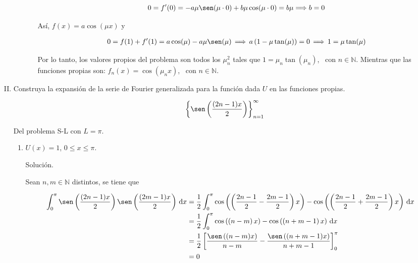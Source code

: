 \documentclass[fleqn]{article}
\newcommand{\nat}{\mathbb{N}}
\newcommand{\integ}[3]{\displaystyle \int_{#1}^{#2} #3 \, \mathrm{d} x}
\begin{document}
\begin{enumerate}[I.]
\begin{enumerate}
\begin{enumerate}[i)]
				\begin{equation*}
					0 = f'(0) = -a \mu \sen(\mu \cdot 0) + b \mu \cos(\mu \cdot 0) = b \mu \Longrightarrow b = 0
				\end{equation*}

				Así, $ f(x) = a \cos(\mu x) $ y 

				\begin{align*}
					0 = f(1) + f'(1) = a \cos(\mu) - a \mu \sen(\mu) \, \Longrightarrow \, a \left( 1 - \mu \tan(\mu) \right) = 0 \, \Longrightarrow \, 1 = \mu \tan (\mu)
				\end{align*}
				
				Por lo tanto, los valores propios del problema son todos los $ \mu_n^2 $ tales que $ 1 = \mu_n \tan (\mu_n) $, \, con $ n \in \nat $. Mientras que las funciones propias son: $ f_n (x) = \cos(\mu_n x) $, \, con $ n \in \nat $.
			\end{enumerate}
			
		\end{enumerate}

		
		\bfseries
			
		\item Construya la expansión de la serie de Fourier generalizada para la función dada $U$ en las funciones propias.
		
		\begin{equation*}
			\left\lbrace \sen \left( \dfrac{(2n - 1) x}{2} \right) \right\rbrace_{n=1}^{\infty}
		\end{equation*}

		Del problema S-L con $ L = \pi $.
		
		\begin{enumerate}
			\item $ U(x) = 1 $, $ 0 \leq x \leq \pi $.
			
			Solución.
			
			\normalfont

                Sean $ n, m \in \nat $ distintos, se tiene que

                \begin{align*}
                     \integ{0}{\pi}{\sen \left( \dfrac{(2n - 1) x}{2} \right) \sen \left( \dfrac{(2m - 1) x}{2} \right)} &= \dfrac{1}{2} \integ{0}{\pi}{ \cos \left( \left( \dfrac{2n - 1}{2} - \dfrac{2m - 1}{2} \right) x \right) - \cos \left( \left( \dfrac{2n - 1}{2} + \dfrac{2m - 1}{2} \right) x \right) } \\
                     &= \dfrac{1}{2} \integ{0}{\pi}{ \cos \left( \left( n - m \right) x \right) - \cos \left( \left( n + m - 1 \right) x \right) } \\
                     &= \dfrac{1}{2} \left[ \dfrac{\sen \left( (n - m) x \right)}{n - m} - \dfrac{\sen \left( (n + m - 1) x \right)}{n + m - 1} \right]_{0}^{\pi} \\
                     &= 0
                \end{align*}


\end{enumerate}
\end{enumerate}
\end{document}
